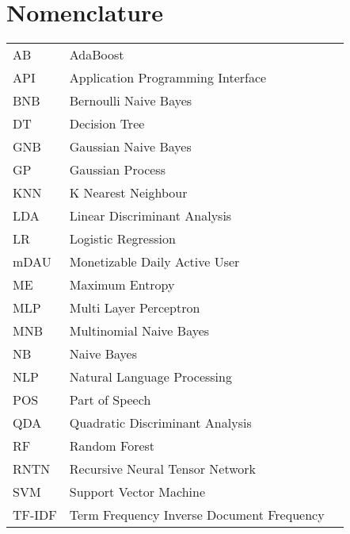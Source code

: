 \chapter*{\Huge{Nomenclature}}
\begin{tabular}{lp{9cm}l}
AB      &   AdaBoost                                \\
API     &   Application Programming Interface       \\
BNB     &   Bernoulli Naive Bayes                   \\
DT      &   Decision Tree                           \\
GNB     &   Gaussian Naive Bayes                    \\
GP      &   Gaussian Process                        \\
KNN     &   K Nearest Neighbour                     \\
LDA     &   Linear Discriminant Analysis            \\
LR      &   Logistic Regression                     \\
mDAU    &   Monetizable Daily Active User           \\
ME      &   Maximum Entropy                         \\
MLP     &   Multi Layer Perceptron                  \\
MNB     &   Multinomial Naive Bayes                 \\
NB      &    Naive Bayes                            \\
NLP     &   Natural Language Processing             \\
POS     &   Part of Speech                          \\
QDA     &   Quadratic Discriminant Analysis         \\
RF      &   Random Forest                           \\
RNTN    &   Recursive Neural Tensor Network         \\
SVM     &   Support Vector Machine                  \\
TF-IDF  &   Term Frequency Inverse Document Frequency \\

\end{tabular}
\vspace{2cm}